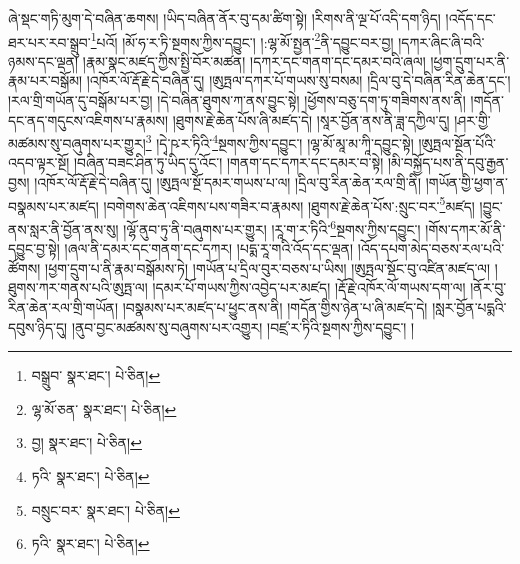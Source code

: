 ཞེ་སྡང་གཏི་མུག་དེ་བཞིན་ཆགས། །ཡིད་བཞིན་ནོར་བུ་དམ་ཚིག་སྟེ། །རིགས་ནི་ལྔ་པོ་འདི་དག་ཉིད། །འདོད་དང་ཐར་པར་རབ་སྒྲུབ་\footnote{བསྒྲུབ་  སྣར་ཐང་།  པེ་ཅིན། }པའོ། །མོ་ཧ་ར་ཏི་སྔགས་ཀྱིས་དབྱུང་། །:ལྷ་མོ་སྤྱན་\footnote{ལྷ་མོ་ཅན་  སྣར་ཐང་།  པེ་ཅིན། }ནི་དབྱུང་བར་བྱ། །དཀར་ཞིང་ཞི་བའི་ཉམས་དང་ལྡན། །རྣམ་སྣང་མཛད་ཀྱིས་སྤྱི་བོར་མཚན། །དཀར་དང་གནག་དང་དམར་བའི་ཞལ། །ཕྱག་དྲུག་པར་ནི་རྣམ་པར་བསྒོམ། །འཁོར་ལོ་རྡོ་རྗེ་དེ་བཞིན་དུ། །ཨུཏྤལ་དཀར་པོ་གཡས་སུ་བསམ། །དྲིལ་བུ་དེ་བཞིན་རིན་ཆེན་དང་། །རལ་གྲི་གཡོན་དུ་བསྒོམ་པར་བྱ། །དེ་བཞིན་ཐུགས་ཀ་ནས་བྱུང་སྟེ། །ཕྱོགས་བཅུ་དག་ཏུ་གཟིགས་ནས་ནི། །གདོན་དང་ནད་གདུངས་འཇིགས་པ་རྣམས། །ཐུགས་རྗེ་ཆེན་པོས་ཞི་མཛད་དེ། །སཱར་བྱོན་ནས་ནི་ཟླ་དཀྱིལ་དུ། །ཤར་གྱི་མཚམས་སུ་བཞུགས་པར་གྱུར།\footnote{བྱ།  སྣར་ཐང་།  པེ་ཅིན། } །དྭེ་ཥ་ར་ཏིའི་\footnote{ཏའི་  སྣར་ཐང་།  པེ་ཅིན། }སྔགས་ཀྱིས་དབྱུང་། །ལྷ་མོ་མཱ་མ་ཀཱི་དབྱུང་སྟེ། །ཨུཏྤལ་སྔོན་པོའི་འདབ་ལྟར་སྔོ། །བཞིན་བཟང་ཤིན་ཏུ་ཡིད་དུ་འོང་། །གནག་དང་དཀར་དང་དམར་བ་སྟེ། །མི་བསྐྱོད་པས་ནི་དབུ་རྒྱན་བྱས། །འཁོར་ལོ་རྡོ་རྗེ་དེ་བཞིན་དུ། །ཨུཏྤལ་སྔོ་དམར་གཡས་པ་ལ། །དྲིལ་བུ་རིན་ཆེན་རལ་གྲི་ནི། །གཡོན་གྱི་ཕྱག་ན་བསྣམས་པར་མཛད། །བགེགས་ཆེན་འཇིགས་པས་གཟིར་བ་རྣམས། །ཐུགས་རྗེ་ཆེན་པོས་:སྲུང་བར་\footnote{བསྲུང་བར་  སྣར་ཐང་།  པེ་ཅིན། }མཛད། །བྱུང་ནས་སླར་ནི་བྱོན་ནས་སུ། །ལྷོ་ནུབ་ཏུ་ནི་བཞུགས་པར་གྱུར། །རཱ་ག་ར་ཏིའི་\footnote{ཏའི་  སྣར་ཐང་།  པེ་ཅིན། }སྔགས་ཀྱིས་དབྱུང་། །གོས་དཀར་མོ་ནི་དབྱུང་བྱ་སྟེ། །ཞལ་ནི་དམར་དང་གནག་དང་དཀར། །པདྨ་རཱ་གའི་འོད་དང་ལྡན། །འོད་དཔག་མེད་བཅས་རལ་པའི་ཚོགས། །ཕྱག་དྲུག་པ་ནི་རྣམ་བསྒོམས་ཏེ། །གཡོན་པ་དྲིལ་བུར་བཅས་པ་ཡིས། །ཨུཏྤལ་སྡོང་བུ་འཛིན་མཛད་ལ། །ཐུགས་ཀར་གནས་པའི་ཨུཏྤ་ལ། །དམར་པོ་གཡས་ཀྱིས་འབྱེད་པར་མཛད། །རྡོ་རྗེ་འཁོར་ལོ་གཡས་དག་ལ། །ནོར་བུ་རིན་ཆེན་རལ་གྲི་གཡོན། །བསྣམས་པར་མཛད་པ་ཕྱུང་ནས་ནི། །གདོན་གྱིས་ཉེན་པ་ཞི་མཛད་དེ། །སླར་བྱོན་པདྨའི་དབུས་ཉིད་དུ། །ནུབ་བྱང་མཚམས་སུ་བཞུགས་པར་འགྱུར། །བཛྲ་ར་ཏིའི་སྔགས་ཀྱིས་དབྱུང་། །
